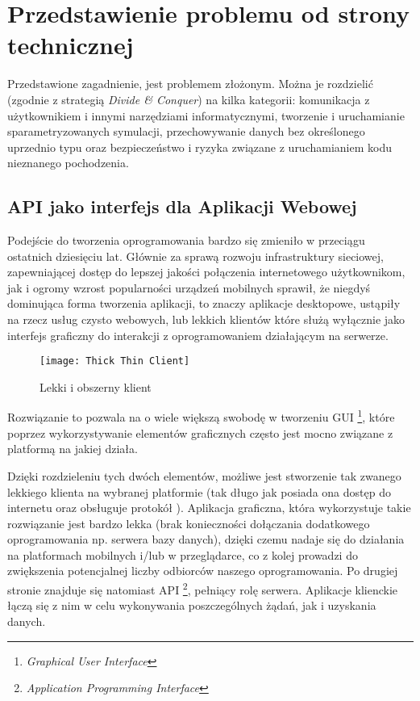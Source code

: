 \chapter{Przedstawienie problemu od strony technicznej}
\label{cha:przedstawienieProblemuOdStronyTechnicznej}

\par Przedstawione zagadnienie, jest problemem złożonym. Można je rozdzielić (zgodnie z strategią \emph{Divide \& Conquer}) na kilka kategorii: komunikacja z użytkownikiem i innymi narzędziami informatycznymi, tworzenie i uruchamianie sparametryzowanych symulacji, przechowywanie danych bez określonego uprzednio typu oraz bezpieczeństwo i ryzyka związane z uruchamianiem kodu nieznanego pochodzenia.

\section{API jako interfejs dla Aplikacji Webowej}

\par Podejście do tworzenia oprogramowania bardzo się zmieniło w przeciągu ostatnich dziesięciu lat. Głównie za sprawą rozwoju infrastruktury sieciowej, zapewniającej dostęp do lepszej jakości połączenia internetowego użytkownikom, jak i ogromy wzrost popularności urządzeń mobilnych sprawił, że niegdyś dominująca forma tworzenia aplikacji, to znaczy aplikacje desktopowe, ustąpiły na rzecz usług czysto webowych, lub lekkich klientów które służą wyłącznie jako interfejs graficzny do interakcji z oprogramowaniem działającym na serwerze.

\begin{figure}[H]
	\begin{center}
		\texttt{[image: Thick Thin Client]}
	\end{center}
	\caption{Lekki i obszerny klient}
\end{figure}

Rozwiązanie to pozwala na o wiele większą swobodę w tworzeniu GUI \footnote{\emph{Graphical User Interface}}, które poprzez wykorzystywanie elementów graficznych często jest mocno związane z platformą na jakiej działa.

\par Dzięki rozdzieleniu tych dwóch elementów, możliwe jest stworzenie tak zwanego lekkiego klienta na wybranej platformie (tak długo jak posiada ona dostęp do internetu oraz obsługuje protokół \texttt{\https{}}). Aplikacja graficzna, która wykorzystuje takie rozwiązanie jest bardzo lekka (brak konieczności dołączania dodatkowego oprogramowania np. serwera bazy danych), dzięki czemu nadaje się do działania na platformach mobilnych i/lub w przeglądarce, co z kolej prowadzi do zwiększenia potencjalnej liczby odbiorców naszego oprogramowania. Po drugiej stronie znajduje się natomiast API \footnote{\emph{Application Programming Interface}}, pełniący rolę serwera. Aplikacje klienckie łączą się z nim w celu wykonywania poszczególnych żądań, jak i uzyskania danych.

